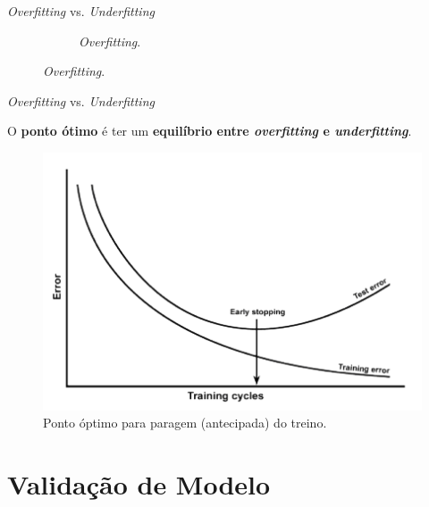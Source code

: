\begin{frame}{\textit{Overfitting} vs. \textit{Underfitting}}
\begin{figure}
\begin{subfigure}{0.3\textwidth}
			\caption{\textit{Overfitting}.}
		\end{subfigure}
	\end{figure}
    
    
\end{frame}

\begin{frame}{\textit{Overfitting} vs. \textit{Underfitting} \cont}
    
    O \textbf{ponto ótimo} é ter um \textbf{equilíbrio entre \textit{overfitting} e \textit{underfitting}}.
    
    \begin{figure}
        \centering
        \includegraphics{img/estop.png}
        \caption{Ponto óptimo para paragem (antecipada) do treino.}
    \end{figure}
    
\end{frame}

\section{Validação de Modelo}

